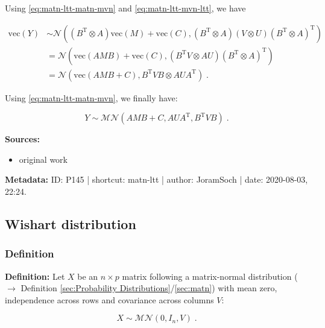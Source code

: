 \documentclass[a4paper,12pt,twoside]{book}
\begin{document}
Using \eqref{eq:matn-ltt-matn-mvn} and \eqref{eq:matn-ltt-mvn-ltt}, we have

\begin{equation} \label{eq:matn-ltt-vec-Y-s2}
\begin{split}
\mathrm{vec}(Y) &\sim \mathcal{N}((B^\mathrm{T} \otimes A) \mathrm{vec}(M) + \mathrm{vec}(C), (B^\mathrm{T} \otimes A) (V \otimes U) (B^\mathrm{T} \otimes A)^\mathrm{T}) \\
&= \mathcal{N}(\mathrm{vec}(AMB) + \mathrm{vec}(C), (B^\mathrm{T}V \otimes AU) (B^\mathrm{T} \otimes A)^\mathrm{T}) \\
&= \mathcal{N}(\mathrm{vec}(AMB + C), B^\mathrm{T}VB \otimes AUA^\mathrm{T}) \; .
\end{split}
\end{equation}

Using \eqref{eq:matn-ltt-matn-mvn}, we finally have:

\begin{equation} \label{eq:matn-ltt-matn-ltt-qed}
Y \sim \mathcal{MN}(AMB + C, AUA^\mathrm{T} ,B^\mathrm{T}VB) \; .
\end{equation}


\vspace{1em}
\textbf{Sources:}
\begin{itemize}
\item original work\end{itemize}


\vspace{1em}
\textbf{Metadata:} ID: P145 | shortcut: matn-ltt | author: JoramSoch | date: 2020-08-03, 22:24.
\vspace{1em}



\subsection{Wishart distribution}

\subsubsection[\textit{Definition}]{Definition} \label{sec:wish}
\setcounter{equation}{0}

\textbf{Definition:} Let $X$ be an $n \times p$ matrix following a matrix-normal distribution ($\rightarrow$ Definition \ref{sec:Probability Distributions}/\ref{sec:matn}) with mean zero, independence across rows and covariance across columns $V$:

\begin{equation} \label{eq:wish-matn}
X \sim \mathcal{MN}(0, I_n, V) \; .
\end{equation}
\end{document}
